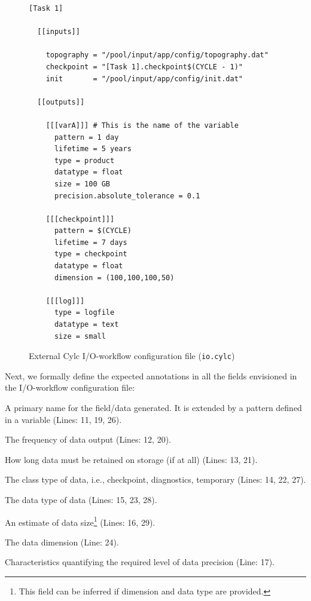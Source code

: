 \documentclass{superfri}
\begin{document}
\begin{figure}[!ht]

\begin{lstlisting}
[Task 1]

  [[inputs]]

    topography = "/pool/input/app/config/topography.dat"
    checkpoint = "[Task 1].checkpoint$(CYCLE - 1)"
    init       = "/pool/input/app/config/init.dat"

  [[outputs]]

    [[[varA]]] # This is the name of the variable
      pattern = 1 day
      lifetime = 5 years
      type = product
      datatype = float
      size = 100 GB
      precision.absolute_tolerance = 0.1

    [[[checkpoint]]]
      pattern = $(CYCLE)
      lifetime = 7 days
      type = checkpoint
      datatype = float
      dimension = (100,100,100,50)

    [[[log]]]
      type = logfile
      datatype = text
      size = small
\end{lstlisting}

\caption{External Cylc I/O-workflow configuration file (\texttt{io.cylc})}
\label{lst:cylc}
\end{figure}

Next, we formally define the expected annotations in all the fields envisioned in the I/O-workflow configuration file:

\begin{description}[itemsep=0pt]

  \item[Name] A primary name for the field/data generated. It is extended by a pattern defined in a variable (Lines: 11, 19, 26).

  \item[Pattern] The frequency of data output (Lines: 12, 20).

  \item[Lifetime] How long data must be retained on storage (if at all) (Lines: 13, 21).

  \item[Type] The class type of data, i.e., checkpoint, diagnostics, temporary (Lines: 14, 22, 27).

  \item[Datatype] The data type of data (Lines: 15, 23, 28).

  \item[Size] An estimate of data size\footnote{This field can be inferred if dimension and data type are provided.} (Lines: 16, 29).

  \item[Dimension] The data dimension (Line: 24).

  \item[Accuracy] Characteristics quantifying the required level of data precision (Line: 17).

\end{description}
\end{document}
